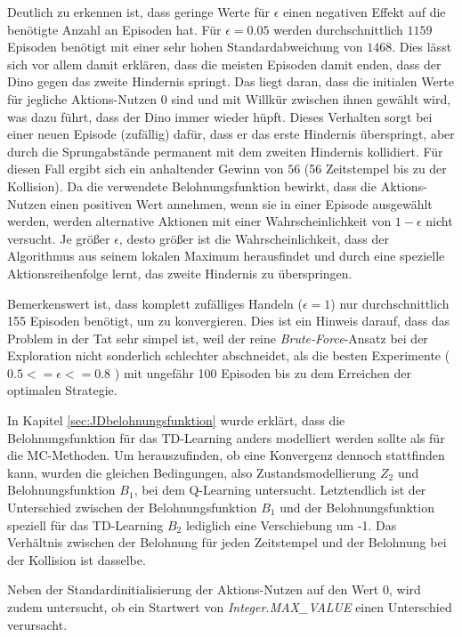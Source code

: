 Deutlich zu erkennen ist, dass geringe Werte für $\epsilon$ einen negativen Effekt auf die benötigte Anzahl an Episoden hat. Für $\epsilon = 0.05$ werden durchschnittlich $1159$ Episoden benötigt mit einer sehr hohen Standardabweichung von $1468$. Dies lässt sich vor allem damit erklären, dass die meisten Episoden damit enden, dass der Dino gegen das zweite Hindernis springt. Das liegt daran, dass die initialen Werte für jegliche Aktions-Nutzen 0 sind und mit Willkür zwischen ihnen gewählt wird, was dazu führt, dass der Dino immer wieder hüpft. Dieses Verhalten sorgt bei einer neuen Episode (zufällig) dafür, dass er das erste Hindernis überspringt, aber durch die Sprungabstände permanent mit dem zweiten Hindernis kollidiert. Für diesen Fall ergibt sich ein anhaltender Gewinn von $56$ (56 Zeitstempel bis zu der Kollision). Da die verwendete Belohnungsfunktion bewirkt, dass die Aktions-Nutzen einen positiven Wert annehmen, wenn sie in einer Episode ausgewählt werden, werden alternative Aktionen mit einer Wahrscheinlichkeit von $1-\epsilon$ nicht versucht. Je größer $\epsilon$, desto größer ist die Wahrscheinlichkeit, dass der Algorithmus aus seinem lokalen Maximum herausfindet und durch eine spezielle Aktionsreihenfolge lernt, das zweite Hindernis zu überspringen.
\par
Bemerkenswert ist, dass komplett zufälliges Handeln ($\epsilon = 1$) nur durchschnittlich 155 Episoden benötigt, um zu konvergieren. Dies ist ein Hinweis darauf, dass das Problem in der Tat sehr simpel ist, weil der reine \textit{Brute-Force}-Ansatz bei der Exploration nicht sonderlich schlechter abschneidet, als die besten Experimente ($0.5 <= \epsilon <= 0.8$ ) mit ungefähr 100 Episoden bis zu dem Erreichen der optimalen Strategie.

\par 
In Kapitel \ref{sec:JDbelohnungsfunktion} wurde erklärt, dass die Belohnungsfunktion für das TD-Learning anders modelliert werden sollte als für die MC-Methoden. Um herauszufinden, ob eine Konvergenz dennoch stattfinden kann, wurden die gleichen Bedingungen, also Zustandsmodellierung $Z_2$ und Belohnungsfunktion $B_1$, bei dem Q-Learning untersucht. Letztendlich ist der Unterschied zwischen der Belohnungsfunktion $B_1$ und der Belohnungsfunktion speziell für das TD-Learning $B_2$ lediglich eine Verschiebung um -1. Das Verhältnis zwischen der Belohnung für jeden Zeitstempel und der Belohnung bei der Kollision ist dasselbe.
\par 
Neben der Standardinitialisierung der Aktions-Nutzen auf den Wert 0, wird zudem untersucht, ob ein Startwert von \textit{Integer.MAX\_VALUE} einen Unterschied verursacht.

